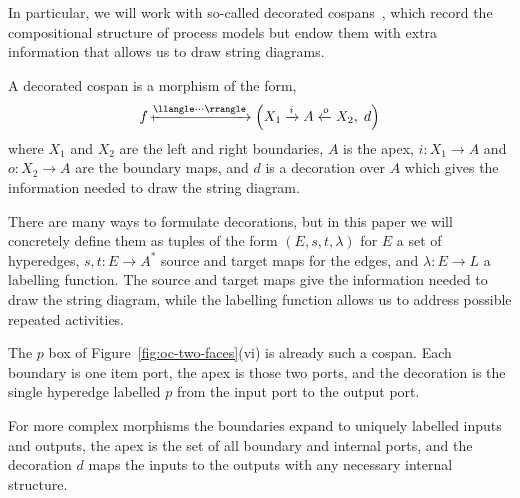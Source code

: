 In particular, we will work with so-called decorated cospans~\cite{fongDecoratedCospans2015}, which record the compositional structure of process models but endow them with extra information that allows us to draw string diagrams.
\begin{definition}\label{def:decorated-cospan}
A decorated cospan is a morphism of the form,
\[
f
\xmapsto{\llangle \cdot\cdot\cdot \rrangle}
\left(X_{1}\xrightarrow{i} A \xleftarrow{o} X_{2},\; d\right)
\]
where $X_1$ and $X_2$ are the left and right boundaries, $A$ is the apex, $i:X_1\to A$ and $o:X_2\to A$ are the boundary maps, and $d$ is a decoration over $A$ which gives the information needed to draw the string diagram.
\end{definition}
\begin{remark}[Decorations]
There are many ways to formulate decorations, but in this paper we will concretely define them as tuples of the form $(E,s,t,\lambda)$ for $E$ a set of hyperedges, $s,t:E\to A^{*}$ source and target maps for the edges, and $\lambda:E\to L$ a labelling function. The source and target maps give the information needed to draw the string diagram, while the labelling function allows us to address possible repeated activities.
\end{remark}

The $p$ box of Figure~\ref{fig:oc-two-faces}(vi) is already such a cospan. Each
boundary is one item port, the apex is those two ports, and the decoration is
the single hyperedge labelled $p$ from the input port to the output port.

\begin{remark}
For more complex morphisms the boundaries expand to uniquely labelled inputs and outputs, the apex is the set of all boundary and internal ports, and the decoration $d$ maps the inputs to the outputs with any necessary internal structure.
\end{remark}

